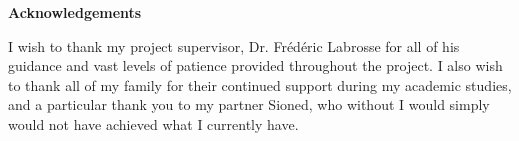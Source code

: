 \thispagestyle{empty}

\begin{center}
    {\LARGE\bf Acknowledgements}
\end{center}

I wish to thank my project supervisor, Dr. Fr\'{e}d\'{e}ric Labrosse for all of his guidance and vast levels of patience provided throughout the project. I also wish to thank all of my family for their continued support during my academic studies, and a particular thank you to my partner Sioned, who without I would simply would not have achieved what I currently have. 